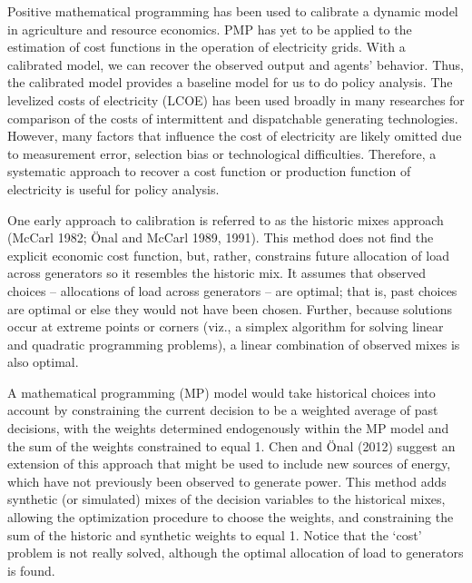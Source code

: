 Positive mathematical programming has been used to calibrate a dynamic
model in agriculture and resource economics. PMP has yet to be applied
to the estimation of cost functions in the operation of electricity
grids. With a calibrated model, we can recover the observed output and
agents' behavior. Thus, the calibrated model provides a baseline model
for us to do policy analysis. The levelized costs of electricity (LCOE)
has been used broadly in many researches for comparison of the costs of
intermittent and dispatchable generating technologies. However, many
factors that influence the cost of electricity are likely omitted due to
measurement error, selection bias or technological difficulties.
Therefore, a systematic approach to recover a cost function or
production function of electricity is useful for policy analysis.

One early approach to calibration is referred to as the historic mixes
approach (McCarl 1982; Önal and McCarl 1989, 1991). This method does not
find the explicit economic cost function, but, rather, constrains future
allocation of load across generators so it resembles the historic mix.
It assumes that observed choices -- allocations of load across
generators -- are optimal; that is, past choices are optimal or else
they would not have been chosen. Further, because solutions occur at
extreme points or corners (viz., a simplex algorithm for solving linear
and quadratic programming problems), a linear combination of observed
mixes is also optimal.

A mathematical programming (MP) model would take historical choices into
account by constraining the current decision to be a weighted average of
past decisions, with the weights determined endogenously within the MP
model and the sum of the weights constrained to equal 1. Chen and Önal
(2012) suggest an extension of this approach that might be used to
include new sources of energy, which have not previously been observed
to generate power. This method adds synthetic (or simulated) mixes of
the decision variables to the historical mixes, allowing the
optimization procedure to choose the weights, and constraining the sum
of the historic and synthetic weights to equal 1. Notice that the `cost'
problem is not really solved, although the optimal allocation of load to
generators is found.

